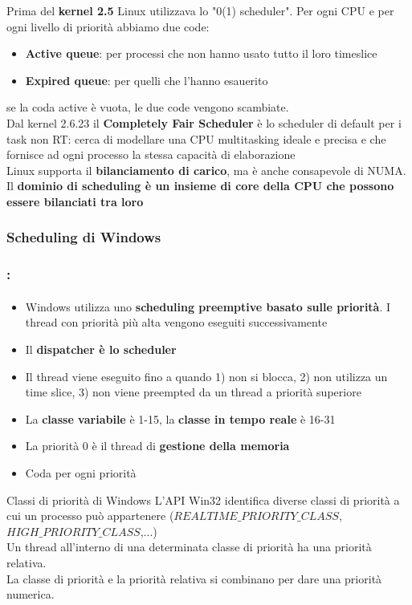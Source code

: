 \documentclass{beamer}
\begin{document}
\begin{frame}
	Prima del \textbf{kernel 2.5} Linux utilizzava lo "0(1) scheduler". Per ogni CPU e per ogni livello di priorità abbiamo due code:
	\begin{itemize}
		\item \textbf{Active queue}: per processi che non hanno usato tutto il loro timeslice
		\item \textbf{Expired queue}: per quelli che l'hanno esauerito
	\end{itemize}
	se la coda active è vuota, le due code vengono scambiate.\\
	Dal kernel 2.6.23 il \textbf{Completely Fair Scheduler} è lo scheduler di default per i task non RT: cerca di modellare una CPU multitasking ideale e precisa e che fornisce ad ogni processo la stessa capacità di elaborazione\\
	Linux supporta il \textbf{bilanciamento di carico}, ma è anche consapevole di NUMA.\\
	Il \textbf{dominio di scheduling è un insieme di core della CPU che possono essere bilanciati tra loro}
\end{frame}
\subsubsection{Scheduling di Windows}
\begin{frame}
		\frametitle{\insertsubsection: \insertsubsubsection}
	\framesubtitle{\insertsection}
	\begin{itemize}
		\item Windows utilizza uno \textbf{scheduling preemptive basato sulle priorità}. I thread con priorità più alta vengono eseguiti successivamente
		\item Il \textbf{dispatcher è lo scheduler}
		\item Il thread viene eseguito fino a quando 1) non si blocca, 2) non utilizza un time slice, 3) non viene preempted da un thread a priorità superiore
		\item La \textbf{classe variabile} è 1-15, la \textbf{classe in tempo reale} è 16-31
		\item La priorità 0 è il thread di \textbf{gestione della memoria}
		\item Coda per ogni priorità
	\end{itemize}
\end{frame}
\begin{frame}{Classi di priorità di Windows}
	L'API Win32 identifica diverse classi di priorità a cui un processo può appartenere ($REALTIME\_PRIORITY\_CLASS$, $HIGH\_PRIORITY\_CLASS$,...)\\
	Un thread all'interno di una determinata classe di priorità ha una priorità relativa.\\
	La classe di priorità e la priorità relativa si combinano per dare una priorità numerica.
\end{frame}
\end{document}
